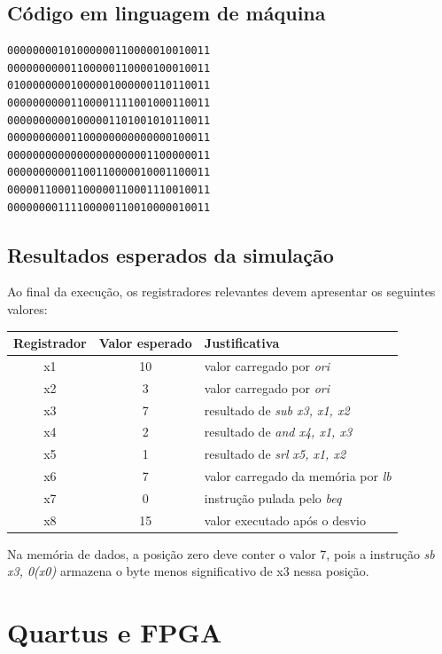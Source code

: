 \documentclass[12pt,a4paper]{article}
\begin{document}
\subsection{Código em linguagem de máquina}

\begin{lstlisting}[style=textstyle,caption={Instruções em binário inseridas no processador.}]
00000000101000000110000010010011
00000000001100000110000100010011
01000000001000001000000110110011
00000000001100001111001000110011
00000000001000001101001010110011
00000000001100000000000000100011
00000000000000000000001100000011
00000000001100110000010001100011
00000110001100000110001110010011
00000000111100000110010000010011
\end{lstlisting}

\subsection{Resultados esperados da simulação}

Ao final da execução, os registradores relevantes devem apresentar os seguintes valores:

\begin{center}
\begin{tabular}{c c l}
\toprule
\textbf{Registrador} & \textbf{Valor esperado} & \textbf{Justificativa} \\
\midrule
x1 & 10 & valor carregado por \textit{ori} \\
x2 & 3 & valor carregado por \textit{ori} \\
x3 & 7 & resultado de \textit{sub x3, x1, x2} \\
x4 & 2 & resultado de \textit{and x4, x1, x3} \\
x5 & 1 & resultado de \textit{srl x5, x1, x2} \\
x6 & 7 & valor carregado da memória por \textit{lb} \\
x7 & 0 & instrução pulada pelo \textit{beq} \\
x8 & 15 & valor executado após o desvio \\
\bottomrule
\end{tabular}
\end{center}

Na memória de dados, a posição zero deve conter o valor 7, pois a instrução \textit{sb x3, 0(x0)} armazena o byte menos significativo de x3 nessa posição.

\section{Quartus e FPGA}
\end{document}
